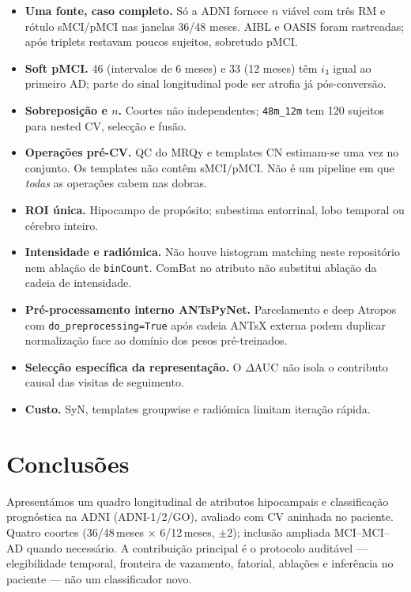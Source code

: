 \documentclass[review]{elsarticle}
\newcommand{\code}[1]{\texttt{#1}}
\begin{document}
\begin{itemize}
	\item \textbf{Uma fonte, caso completo.} Só a ADNI fornece $n$ viável com três RM e rótulo sMCI/pMCI nas janelas 36/48 meses.
	AIBL e OASIS foram rastreadas; após triplets restavam poucos sujeitos, sobretudo pMCI.
	\item \textbf{Soft pMCI.} 46 (intervalos de 6 meses) e 33 (12 meses) têm $i_3$ igual ao primeiro AD; parte do sinal longitudinal pode ser atrofia já pós-conversão.
	\item \textbf{Sobreposição e $n$.} Coortes não independentes; \code{48m\_12m} tem 120 sujeitos para nested CV, selecção e fusão.
	\item \textbf{Operações pré-CV.} QC do MRQy e templates CN estimam-se uma vez no conjunto.
	Os templates não contêm sMCI/pMCI.
	Não é um pipeline em que \emph{todas} as operações cabem nas dobras.
	\item \textbf{ROI única.} Hipocampo de propósito; subestima entorrinal, lobo temporal ou cérebro inteiro.
	\item \textbf{Intensidade e radiómica.} Não houve histogram matching neste repositório nem ablação de \code{binCount}.
	ComBat no atributo não substitui ablação da cadeia de intensidade.
	\item \textbf{Pré-processamento interno ANTsPyNet.} Parcelamento e deep Atropos com \code{do\_preprocessing=True} após cadeia ANTsX externa podem duplicar normalização face ao domínio dos pesos pré-treinados.
	\item \textbf{Selecção específica da representação.} O $\Delta$AUC não isola o contributo causal das visitas de seguimento.
	\item \textbf{Custo.} SyN, templates groupwise e radiómica limitam iteração rápida.
\end{itemize}

\section{Conclusões}
\label{sec:conclusoes}

Apresentámos um quadro longitudinal de atributos hipocampais e classificação prognóstica na ADNI (ADNI-1/2/GO), avaliado com CV aninhada no paciente.
Quatro coortes (36/48\,meses $\times$ 6/12\,meses, $\pm 2$); inclusão ampliada MCI--MCI--AD quando necessário.
A contribuição principal é o protocolo auditável --- elegibilidade temporal, fronteira de vazamento, fatorial, ablações e inferência no paciente --- não um classificador novo.
\end{document}
